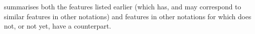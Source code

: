  summarises both the features listed earlier
(which \langname{} has, and may correspond to similar features in other
notations) and features in other notations for which \langname{} does not,
or not yet, have a counterpart.

